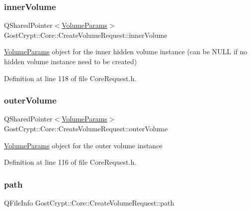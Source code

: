 \subsubsection{\texorpdfstring{inner\+Volume}{innerVolume}}
{\footnotesize\ttfamily Q\+Shared\+Pointer$<$\hyperlink{struct_gost_crypt_1_1_core_1_1_create_volume_request_1_1_volume_params}{Volume\+Params}$>$ Gost\+Crypt\+::\+Core\+::\+Create\+Volume\+Request\+::inner\+Volume}

\hyperlink{struct_gost_crypt_1_1_core_1_1_create_volume_request_1_1_volume_params}{Volume\+Params} object for the inner hidden volume instance (can be N\+U\+LL if no hidden volume instance need to be created) 

Definition at line 118 of file Core\+Request.\+h.

\mbox{\label{struct_gost_crypt_1_1_core_1_1_create_volume_request_a7f07dffa570aa30985f32f42a7d4bd11}} 
\subsubsection{\texorpdfstring{outer\+Volume}{outerVolume}}
{\footnotesize\ttfamily Q\+Shared\+Pointer$<$\hyperlink{struct_gost_crypt_1_1_core_1_1_create_volume_request_1_1_volume_params}{Volume\+Params}$>$ Gost\+Crypt\+::\+Core\+::\+Create\+Volume\+Request\+::outer\+Volume}

\hyperlink{struct_gost_crypt_1_1_core_1_1_create_volume_request_1_1_volume_params}{Volume\+Params} object for the outer volume instance 

Definition at line 116 of file Core\+Request.\+h.

\mbox{\label{struct_gost_crypt_1_1_core_1_1_create_volume_request_a1760fb8fc07a2d908b8e5d5aff4b2804}} 
\subsubsection{\texorpdfstring{path}{path}}
{\footnotesize\ttfamily Q\+File\+Info Gost\+Crypt\+::\+Core\+::\+Create\+Volume\+Request\+::path}

